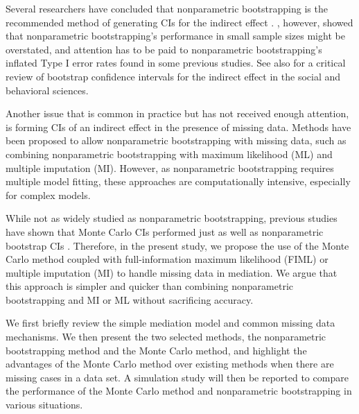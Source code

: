 \documentclass[man]{apa7}\usepackage[]{graphicx}\usepackage[]{xcolor}
\begin{document}
Several researchers have concluded that nonparametric bootstrapping
is the recommended method of generating CIs for the indirect effect
\parencite[e.g.,][]{Lib-Mediation-Bootstrap-Shrout-2002,
	Lib-Mediation-Monte-Carlo-Method-MacKinnon-2004,
	Lib-Mediation-Bootstrap-Preacher-2008,
	Lib-Mediation-Bootstrap-Cheung-2007-07,
	Lib-Mediation-Bootstrap-Taylor-2007,
	Lib-Mediation-Profile-Likelihood-Cheung-2009a,
Lib-Mediation-Bootstrap-Biesanz-2010}.
\Textcite{Lib-Mediation-Bootstrap-Koopman-2015},
however,
showed that nonparametric bootstrapping's performance in small sample sizes 
might be overstated,
and attention has to be paid to nonparametric bootstrapping's
inflated Type I error rates found in some previous studies.
See also 
\Textcite{Lib-Mediation-Bootstrap-Koopman-2014}
for a critical review of bootstrap confidence intervals for the indirect effect
in the social and behavioral sciences.

Another issue that is common in practice but has not received enough attention,
is forming CIs of an indirect effect in the presence of missing data.
Methods have been proposed to allow nonparametric bootstrapping
with missing data,
such as combining nonparametric bootstrapping with maximum likelihood (ML)
and multiple imputation (MI).
However,
as nonparametric bootstrapping requires multiple model fitting,
these approaches are computationally intensive,
especially for complex models.

While not as widely studied as nonparametric bootstrapping,
previous studies have shown that Monte Carlo CIs performed
just as well as nonparametric bootstrap CIs
\parencite[see][]{Lib-Mediation-Monte-Carlo-Method-MacKinnon-2004,
	Lib-Mediation-Monte-Carlo-Method-Preacher-2012,
Lib-Mediation-Monte-Carlo-Method-Tofighi-2015}.
Therefore,
in the present study,
we propose the use of the Monte Carlo method coupled
with full-information maximum likelihood (FIML) or multiple imputation (MI)
to handle missing data in mediation.
We argue that this approach is simpler and quicker
than combining nonparametric bootstrapping and MI or ML
without sacrificing accuracy.

We first briefly review the simple mediation model
and common missing data mechanisms.
We then present the two selected methods,
the nonparametric bootstrapping method and the Monte Carlo method,
and highlight the advantages of the Monte Carlo method over existing methods
when there are missing cases in a data set.
A simulation study will then be reported to compare the performance
of the Monte Carlo method and nonparametric bootstrapping in various situations.
\end{document}
